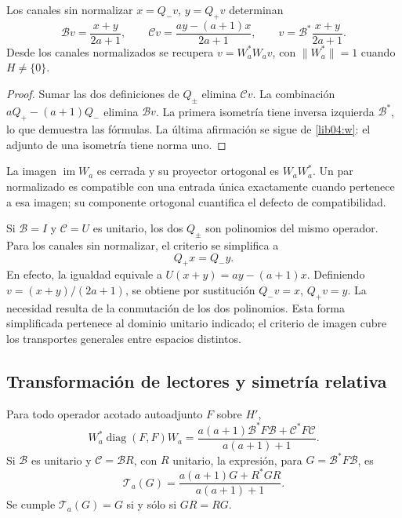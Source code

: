 \begin{proposition}
\label{lib04:prop-recuperacion}
Los canales sin normalizar \(x=Q_-v\), \(y=Q_+v\) determinan
\begin{equation}
 \mathcal Bv=\frac{x+y}{2a+1},\qquad
 \mathcal Cv=\frac{ay-(a+1)x}{2a+1},\qquad
 v=\mathcal B^*\frac{x+y}{2a+1}.
 \label{lib04:inversa-canales}
\end{equation}
Desde los canales normalizados se recupera
\(v=W_a^*W_av\), con \(\|W_a^*\|=1\) cuando \(H\neq\{0\}\).
\end{proposition}

\begin{proof}
Sumar las dos definiciones de \(Q_\pm\) elimina \(\mathcal Cv\).
La combinación \(aQ_+-(a+1)Q_-\) elimina \(\mathcal Bv\).
La primera isometría tiene inversa izquierda \(\mathcal B^*\), lo
que demuestra las fórmulas. La última afirmación se sigue de
\eqref{lib04:w}: el adjunto de una isometría tiene norma uno.
\end{proof}

La imagen \(\operatorname{im}W_a\) es cerrada y su proyector
ortogonal es \(W_aW_a^*\). Un par normalizado es compatible con una
entrada única exactamente cuando pertenece a esa imagen; su componente
ortogonal cuantifica el defecto de compatibilidad.

Si \(\mathcal B=I\) y \(\mathcal C=U\) es unitario, los dos
\(Q_\pm\) son polinomios del mismo operador. Para los canales sin
normalizar, el criterio se simplifica a
\begin{equation}
 Q_+x=Q_-y.
 \label{lib04:compatibilidad-unitaria}
\end{equation}
En efecto, la igualdad equivale a
\(U(x+y)=ay-(a+1)x\). Definiendo
\(v=(x+y)/(2a+1)\), se obtiene por sustitución
\(Q_-v=x\), \(Q_+v=y\). La necesidad resulta de la conmutación
de los dos polinomios. Esta forma simplificada pertenece al dominio
unitario indicado; el criterio de imagen cubre los transportes
generales entre espacios distintos.

\subsection{Transformación de lectores y simetría relativa}
\label{lib04:lectores}

\begin{theorem}
\label{lib04:teo-lector}
Para todo operador acotado autoadjunto \(F\) sobre \(H'\),
\begin{equation}
 W_a^*\operatorname{diag}(F,F)W_a
 =\frac{a(a+1)\mathcal B^*F\mathcal B+
                  \mathcal C^*F\mathcal C}{a(a+1)+1}.
 \label{lib04:lector-general}
\end{equation}
Si \(\mathcal B\) es unitario y \(\mathcal C=\mathcal BR\), con
\(R\) unitario, la expresión, para \(G=\mathcal B^*F\mathcal B\),
es
\begin{equation}
 \mathcal T_a(G)=\frac{a(a+1)G+R^*GR}{a(a+1)+1}.
 \label{lib04:lector-relativo}
\end{equation}
Se cumple \(\mathcal T_a(G)=G\) si y sólo si \(GR=RG\).
\end{theorem}

